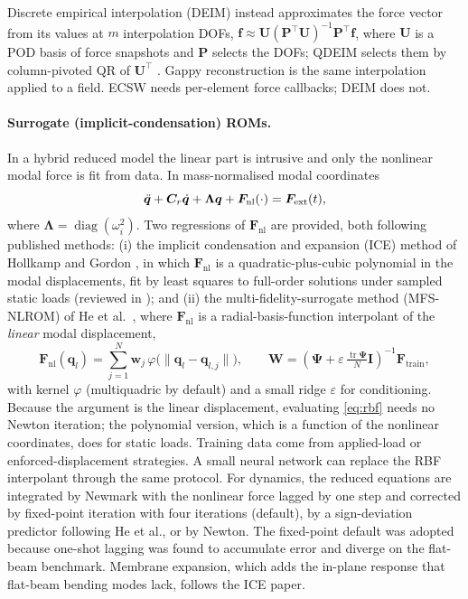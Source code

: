 Discrete empirical interpolation (DEIM) \cite{chaturantabut2010deim} instead approximates the force vector from its values at $m$ interpolation DOFs, $\bm f\approx\bm U(\bm P^{\!\top}\bm U)^{-1}\bm P^{\!\top}\bm f$, where $\bm U$ is a POD basis of force snapshots and $\bm P$ selects the DOFs;
QDEIM selects them by column-pivoted QR of $\bm U^{\!\top}$ \cite{drmac2016qdeim}. Gappy reconstruction is the same interpolation applied to a field. ECSW needs per-element force callbacks; DEIM does not.

\paragraph{Surrogate (implicit-condensation) ROMs.}
In a hybrid reduced model the linear part is intrusive and only the nonlinear modal force is fit from data. In mass-normalised modal coordinates
\begin{equation}
  \ddot{\bm q}+\bm{C}_r\dot{\bm q}+\bm\Lambda\bm q+\bm F_{\mathrm{nl}}(\cdot)=\bm F_{\mathrm{ext}}(t),
  \label{eq:hybrid}
\end{equation}
where $\bm\Lambda=\operatorname{diag}(\omega_i^2)$. Two regressions of $\bm F_{\mathrm{nl}}$ are provided, both following published methods:
(i) the implicit condensation and expansion (ICE) method of Hollkamp and Gordon \cite{hollkamp2008ice}, in which $\bm F_{\mathrm{nl}}$ is a quadratic-plus-cubic polynomial in the modal displacements, fit by least squares to full-order solutions under sampled static loads (reviewed in \cite{mignolet2013review}); and
(ii) the multi-fidelity-surrogate method (MFS-NLROM) of He et al.\ \cite{he2023mfsnlrom}, where $\bm F_{\mathrm{nl}}$ is a radial-basis-function interpolant of the \emph{linear} modal displacement,
\begin{equation}
  \bm F_{\mathrm{nl}}(\bm q_l)=\sum_{j=1}^{N}\bm w_j\,\varphi\bigl(\|\bm q_l-\bm q_{l,j}\|\bigr),\qquad \bm W=(\bm\Psi+\varepsilon\,\tfrac{\operatorname{tr}\bm\Psi}{N}\bm I)^{-1}\bm F_{\mathrm{train}},
  \label{eq:rbf}
\end{equation}
with kernel $\varphi$ (multiquadric by default) and a small ridge $\varepsilon$ for conditioning. Because the argument is the linear displacement, evaluating \eqref{eq:rbf} needs no Newton iteration; the polynomial version, which is a function of the nonlinear coordinates, does for static loads. Training data come from applied-load or enforced-displacement strategies. A small neural network can replace the RBF interpolant through the same protocol.
For dynamics, the reduced equations are integrated by Newmark with the nonlinear force lagged by one step and corrected by fixed-point iteration with four iterations (default), by a sign-deviation predictor following He et al., or by Newton. The fixed-point default was
adopted because one-shot lagging was found to accumulate error and diverge on the flat-beam benchmark. Membrane expansion, which adds the in-plane response that flat-beam bending modes lack, follows the ICE paper.


